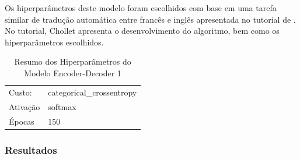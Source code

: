 Os hiperparâmetros deste modelo foram escolhidos com base em uma tarefa similar de tradução automática entre francês e inglês apresentada no tutorial de \cite{tutorial}. No tutorial, Chollet apresenta o desenvolvimento do algoritmo, bem como os hiperparâmetros escolhidos.  

\begin{table}[H]
\centering
\begin{tabular}{ll}
Custo: & categorical\_crossentropy \\
Ativação & softmax \\
Épocas & 150 \\
\end{tabular}
\caption{Resumo dos Hiperparâmetros do Modelo Encoder-Decoder 1}
\label{tab:resumo21}
\end{table}


\subsubsection{Resultados}



